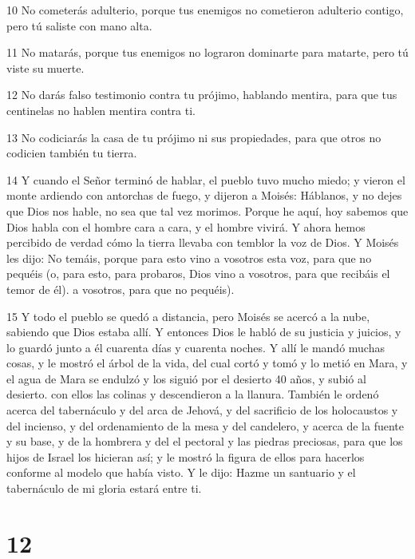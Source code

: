 \par 10 No cometerás adulterio, porque tus enemigos no cometieron adulterio contigo, pero tú saliste con mano alta.

\par 11 No matarás, porque tus enemigos no lograron dominarte para matarte, pero tú viste su muerte.

\par 12 No darás falso testimonio contra tu prójimo, hablando mentira, para que tus centinelas no hablen mentira contra ti.

\par 13 No codiciarás la casa de tu prójimo ni sus propiedades, para que otros no codicien también tu tierra.

\par 14 Y cuando el Señor terminó de hablar, el pueblo tuvo mucho miedo; y vieron el monte ardiendo con antorchas de fuego, y dijeron a Moisés: Háblanos, y no dejes que Dios nos hable, no sea que tal vez morimos. Porque he aquí, hoy sabemos que Dios habla con el hombre cara a cara, y el hombre vivirá. Y ahora hemos percibido de verdad cómo la tierra llevaba con temblor la voz de Dios. Y Moisés les dijo: No temáis, porque para esto vino a vosotros esta voz, para que no pequéis (o, para esto, para probaros, Dios vino a vosotros, para que recibáis el temor de él). a vosotros, para que no pequéis).

\par 15 Y todo el pueblo se quedó a distancia, pero Moisés se acercó a la nube, sabiendo que Dios estaba allí. Y entonces Dios le habló de su justicia y juicios, y lo guardó junto a él cuarenta días y cuarenta noches. Y allí le mandó muchas cosas, y le mostró el árbol de la vida, del cual cortó y tomó y lo metió en Mara, y el agua de Mara se endulzó y los siguió por el desierto 40 años, y subió al desierto. con ellos las colinas y descendieron a la llanura. También le ordenó acerca del tabernáculo y del arca de Jehová, y del sacrificio de los holocaustos y del incienso, y del ordenamiento de la mesa y del candelero, y acerca de la fuente y su base, y de la hombrera y del el pectoral y las piedras preciosas, para que los hijos de Israel los hicieran así; y le mostró la figura de ellos para hacerlos conforme al modelo que había visto. Y le dijo: Hazme un santuario y el tabernáculo de mi gloria estará entre ti.

\chapter{12}

